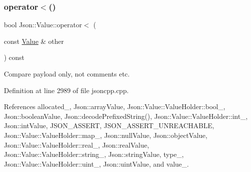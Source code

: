 \subsubsection{\texorpdfstring{operator$<$()}{operator<()}}
{\footnotesize\ttfamily bool Json\+::\+Value\+::operator$<$ (\begin{DoxyParamCaption}\item[{const \hyperlink{class_json_1_1_value}{Value} \&}]{other }\end{DoxyParamCaption}) const}



Compare payload only, not comments etc. 



Definition at line 2989 of file jsoncpp.\+cpp.



References allocated\+\_\+, Json\+::array\+Value, Json\+::\+Value\+::\+Value\+Holder\+::bool\+\_\+, Json\+::boolean\+Value, Json\+::decode\+Prefixed\+String(), Json\+::\+Value\+::\+Value\+Holder\+::int\+\_\+, Json\+::int\+Value, J\+S\+O\+N\+\_\+\+A\+S\+S\+E\+RT, J\+S\+O\+N\+\_\+\+A\+S\+S\+E\+R\+T\+\_\+\+U\+N\+R\+E\+A\+C\+H\+A\+B\+LE, Json\+::\+Value\+::\+Value\+Holder\+::map\+\_\+, Json\+::null\+Value, Json\+::object\+Value, Json\+::\+Value\+::\+Value\+Holder\+::real\+\_\+, Json\+::real\+Value, Json\+::\+Value\+::\+Value\+Holder\+::string\+\_\+, Json\+::string\+Value, type\+\_\+, Json\+::\+Value\+::\+Value\+Holder\+::uint\+\_\+, Json\+::uint\+Value, and value\+\_\+.


